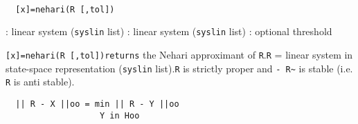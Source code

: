 \begin{mandesc}
   \\ %
\end{mandesc}
\begin{calling_sequence}
\begin{verbatim}
  [x]=nehari(R [,tol])  
\end{verbatim}
\end{calling_sequence}
\begin{parameters}
  \begin{varlist}
    : linear system (\verb!syslin! list)
    : linear system (\verb!syslin! list)
    : optional threshold
  \end{varlist}
\end{parameters}
\begin{mandescription}
  \verb![x]=nehari(R [,tol])returns! the Nehari approximant of \verb!R!.\verb!R!
  = linear system in state-space representation (\verb!syslin! list).\verb!R! is
  strictly proper and \verb!- R~! is stable (i.e. \verb!R! is anti stable).
\begin{verbatim}
  || R - X ||oo = min || R - Y ||oo
                   Y in Hoo
\end{verbatim}
\end{mandescription}
